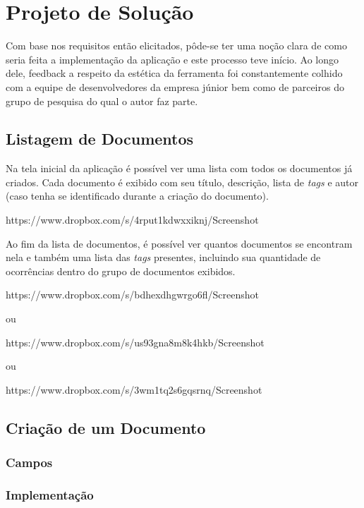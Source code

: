 \chapter{Projeto de Solução}

Com base nos requisitos então elicitados, pôde-se ter uma noção clara de como seria feita a implementação da aplicação e este processo teve início. Ao longo dele, feedback a respeito da estética da ferramenta foi constantemente colhido com a equipe de desenvolvedores da empresa júnior bem como de parceiros do grupo de pesquisa do qual o autor faz parte.

\section{Listagem de Documentos}

Na tela inicial da aplicação é possível ver uma lista com todos os documentos já criados. Cada documento é exibido com seu título, descrição, lista de \textit{tags} e autor (caso tenha se identificado durante a criação do documento).

https://www.dropbox.com/s/4rput1kdwxxiknj/Screenshot%

Ao fim da lista de documentos, é possível ver quantos documentos se encontram nela e também uma lista das \textit{tags} presentes, incluindo sua quantidade de ocorrências dentro do grupo de documentos exibidos.

https://www.dropbox.com/s/bdhexdhgwrgo6fl/Screenshot%

ou

https://www.dropbox.com/s/us93gna8m8k4hkb/Screenshot%

ou

https://www.dropbox.com/s/3wm1tq2s6gqsrnq/Screenshot%

\section{Criação de um Documento}

\subsection{Campos}
\subsection{Implementação}

